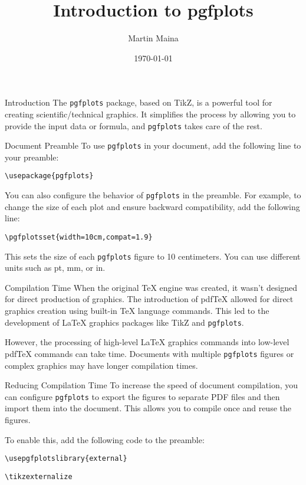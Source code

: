 \documentclass{beamer}
\title{Introduction to pgfplots}
\author{Martin Maina}
\institute{JKUAT}
\date{\today}
\begin{document}
\begin{frame}
  \titlepage
\end{frame}

\begin{frame}{Introduction}
  The \texttt{pgfplots} package, based on TikZ, is a powerful tool for creating scientific/technical graphics. It simplifies the process by allowing you to provide the input data or formula, and \texttt{pgfplots} takes care of the rest.
\end{frame}
\begin{frame}{Document Preamble}
  To use \texttt{pgfplots} in your document, add the following line to your preamble:
  
  \texttt{\textbackslash usepackage\{pgfplots\}}
  
  You can also configure the behavior of \texttt{pgfplots} in the preamble. For example, to change the size of each plot and ensure backward compatibility, add the following line:
  
  \texttt{\textbackslash pgfplotsset\{width=10cm,compat=1.9\}}
  
  This sets the size of each \texttt{pgfplots} figure to 10 centimeters. You can use different units such as pt, mm, or in.
\end{frame}

\begin{frame}{Compilation Time}
  When the original TeX engine was created, it wasn't designed for direct production of graphics. The introduction of pdfTeX allowed for direct graphics creation using built-in TeX language commands. This led to the development of LaTeX graphics packages like TikZ and \texttt{pgfplots}.
  
  However, the processing of high-level LaTeX graphics commands into low-level pdfTeX commands can take time. Documents with multiple \texttt{pgfplots} figures or complex graphics may have longer compilation times.
\end{frame}

\begin{frame}{Reducing Compilation Time}
  To increase the speed of document compilation, you can configure \texttt{pgfplots} to export the figures to separate PDF files and then import them into the document. This allows you to compile once and reuse the figures.
  
  To enable this, add the following code to the preamble:
  
  \texttt{\textbackslash usepgfplotslibrary\{external\}}
  
  \texttt{\textbackslash tikzexternalize}
\end{frame}
\end{document}
